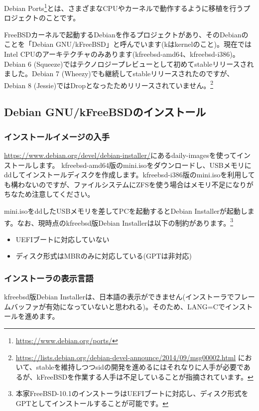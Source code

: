 \documentclass[mingoth,a4paper]{jsarticle}
\begin{document}
Debian Ports\footnote{\url{https://www.debian.org/ports/}}とは、さまざまなCPUやカーネルで動作するように移植を行うプロジェクトのことです。

FreeBSDカーネルで起動するDebianを作るプロジェクトがあり、そのDebianのことを「Debian GNU/kFreeBSD」と呼んでいます(kはkernelのこと)。現在ではIntel CPUのアーキテクチャのみあります(kfreebsd-amd64、kfreebsd-i386)。Debian 6 (Squeeze)ではテクノロジープレビューとして初めてstableリリースされました。Debian 7 (Wheezy)でも継続してstableリリースされたのですが、Debian 8 (Jessie)ではDropとなったためリリースされていません。\footnote{\url{https://lists.debian.org/debian-devel-announce/2014/09/msg00002.html} において、stableを維持しつつsidの開発を進めるにはそれなりに人手が必要であるが、kFreeBSDを作業する人手は不足していることが指摘されています。}


\subsection{Debian GNU/kFreeBSDのインストール}
\subsubsection{インストールイメージの入手}

\url{https://www.debian.org/devel/debian-installer/}にあるdaily-imagesを使ってインストールします。
kfreebsd-amd64版のmini.isoをダウンロードし、USBメモリにddしてインストールディスクを作成します。kfreebsd-i386版のmini.isoを利用しても構わないのですが、ファイルシステムにZFSを使う場合はメモリ不足になりがちなため注意してください。

mini.isoをddしたUSBメモリを差してPCを起動するとDebian Installerが起動します。なお、現時点のkfreebsd版Debian Installerは以下の制約があります。\footnote{本家FreeBSD-10.1のインストーラはUEFIブートに対応し、ディスク形式をGPTとしてインストールすることが可能です。}
\begin{itemize}
  \item UEFIブートに対応していない
  \item ディスク形式はMBRのみに対応している(GPTは非対応)
\end{itemize}


\subsubsection{インストーラの表示言語}

kfreebsd版Debian Installerは、日本語の表示ができません(インストーラでフレームバッファが有効になっていないと思われる)。そのため、LANG=Cでインストールを進めます。
\end{document}
